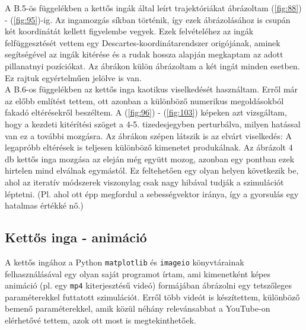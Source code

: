\begin{multicols}{2}
A B.5-ös függelékben a kettős ingák által leírt trajektóriákat ábrázoltam (\ref{fig:88}) - (\ref{fig:95})-ig. Az ingamozgás síkban történik, így ezek ábrázolásához is csupán két koordinátát kellett figyelembe vegyek. Ezek felvételéhez az ingák felfüggesztését vettem egy Descartes-koordinátarendszer origójának, aminek segítségével az ingák kitérése és a rudak hossza alapján megkaptam az adott pillanatnyi pozíciókat. Az ábrákon külön ábrázoltam a két ingát minden esetben. Ez rajtuk egyértelműen jelölve is van. \\
A B.6-os függelékben az kettős inga kaotikus viselkedését használtam. Erről már az előbb említést tettem, ott azonban a különböző numerikus megoldásokból fakadó eltérésekről beszéltem. A (\ref{fig:96}) - (\ref{fig:103}) képeken azt vizsgáltam, hogy a kezdeti kitérítési szöget a 4-5. tizedesjegyben perturbálva, milyen hatással van ez a további mozgásra. Az ábrákon szépen látszik is az elvárt viselkedés: A legapróbb eltérések is teljesen különböző kimenetet produkálnak. Az ábrázolt 4 db kettős inga mozgása az eleján még együtt mozog, azonban egy pontban ezek hirtelen mind elválnak egymástól. Ez feltehetően egy olyan helyen következik be, ahol az iteratív módszerek viszonylag csak nagy hibával tudják a szimulációt léptetni. (Pl. ahol ott épp megfordul a sebességvektor iránya, így a gyorsulás egy hatalmas értékké nő.)

\subsection{Kettős inga - animáció} \label{sub:4.3}
A kettős ingához a Python \texttt{matplotlib} és \texttt{imageio} könyvtárainak felhasználásával egy olyan saját programot írtam, ami kimenetként képes animáció (pl. egy \texttt{mp4} kiterjesztésű videó) formájában ábrázolni egy tetszőleges paraméterekkel futtatott szimulációt. Erről több videót is készítettem, különböző bemenő paraméterekkel, amik közül néhány relevánsabbat a YouTube-on elérhetővé tettem, azok ott most is megtekinthetőek\cite{yt}.


\end{multicols}
